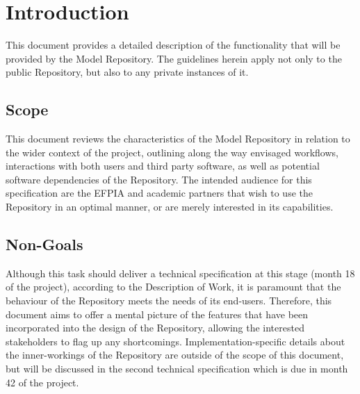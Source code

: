 \section{Introduction}
\label{introduction}
This document provides a detailed description of the functionality that will be provided by the \ddmore Model Repository. The guidelines herein apply not only to the public Repository, but also to any private instances of it.

\subsection{Scope}
This document reviews the characteristics of the \ddmore Model Repository in relation to the wider context of the project, outlining along the way envisaged workflows, interactions with both users and third party software, as well as potential software dependencies of the Repository. The intended audience for this specification are the EFPIA and academic partners that wish to use the Repository in an optimal manner, or are merely interested in its capabilities.

\subsection{Non-Goals}
Although this task should deliver a technical specification at this stage (month 18 of the project), according to the Description of Work, it is paramount that the behaviour of the Repository meets the needs of its end-users. Therefore, this document aims to offer a mental picture of the \gls{feature}s that have been incorporated into the design of the Repository, allowing the interested stakeholders to flag up any shortcomings. Implementation-specific details about the inner-workings of the Repository are outside of the scope of this document, but will be discussed in the second technical specification which is due in month 42 of the project. 

